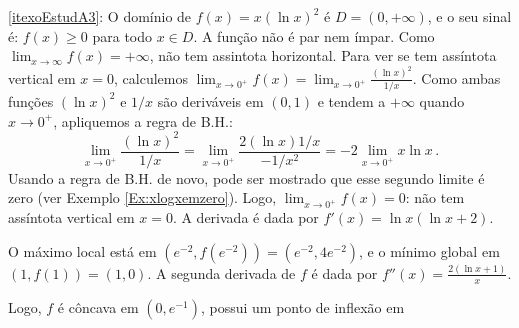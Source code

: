 \begin{Solution}{8.6}
\begin{center}
\begin{bmlimage}
\end{bmlimage}
\end{center}
\eqref{itexoEstudA3}:
O domínio de  $f(x)=x(\ln x)^2$ é
$D=(0,+\infty)$, e o seu sinal é: $f(x)\geq 0$ para todo $x\in D$.
A função não é { par} nem { ímpar}.
Como $\lim_{x\to \infty}f(x)=+\infty$, não tem assintota horizontal.
Para ver se tem assíntota vertical em $x=0$, calculemos
$\lim_{x\to 0^+}f(x)=\lim_{x\to 0^+}\frac{(\ln x)^2}{1/x}$. Como ambas funções
$(\ln x)^2$ e $1/x$ são deriváveis em $(0,1)$ e tendem a $+\infty$ quando $x\to
0^+$, apliquemos a regra de B.H.:
$$
\lim_{x\to 0^+}\frac{(\ln x)^2}{1/x}=
\lim_{x\to 0^+}\frac{2(\ln x)1/x}{-1/x^2}=
-2\lim_{x\to 0^+}x\ln x\,.
$$
Usando a regra de B.H. de novo, pode ser mostrado que esse segundo limite é
zero (ver Exemplo \ref{Ex:xlogxemzero}). Logo, $\lim_{x\to 0^+}f(x)=0$: não
tem assíntota vertical em $x=0$.
A derivada é dada por $f'(x)=\ln x(\ln x+2)$.
\begin{center}
\begin{bmlimage}\end{bmlimage}
\end{center}
O máximo local está em
$(e^{-2},f(e^{-2}))=(e^{-2},4e^{- 2})$, e o
mínimo global em $(1,f(1))=(1,0)$.
A {segunda derivada} de $f$ é dada por
$f''(x)=\frac{2(\ln x+1)}{x}$.
\begin{center}
\begin{bmlimage}\end{bmlimage}
\end{center}
Logo, $f$ é côncava em $(0,e^{-1})$, possui um ponto de inflexão em

\end{Solution}
